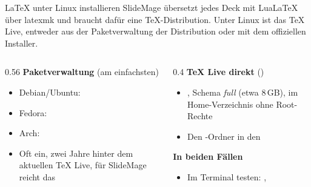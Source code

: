 

\begin{standardframe}{LaTeX unter Linux installieren}
	\small
	SlideMage übersetzt jedes Deck mit LuaLaTeX über latexmk und braucht dafür
	eine TeX-Distribution. Unter Linux ist das TeX Live, entweder aus der
	Paketverwaltung der Distribution oder mit dem offiziellen Installer.
	\par
	\begin{columns}[T,onlytextwidth]
		\begin{column}{0.56\linewidth}
			\textbf{Paketverwaltung} (am einfachsten)
			\begin{itemize}
				\item Debian/Ubuntu: 
				\item Fedora: 
				\item Arch: 
				\item Oft ein, zwei Jahre hinter dem aktuellen TeX Live, für SlideMage reicht das
			\end{itemize}
		\end{column}
		\begin{column}{0.4\linewidth}
			\textbf{TeX Live direkt} ()
			\begin{itemize}
				\item {}, Schema \emph{full} (etwa 8\,GB), im Home-Verzeichnis ohne Root-Rechte
				\item Den -Ordner in den 
			\end{itemize}
			\medskip
			\textbf{In beiden Fällen}
			\begin{itemize}
				\item Im Terminal testen: , 
			\end{itemize}
		\end{column}
	\end{columns}
\end{standardframe}
